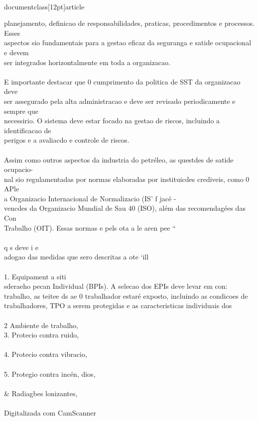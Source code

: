 \\documentclass[12pt]{article}
\begin{document}
{{{{{planejamento, definicao de responsabilidades, praticas, procedimentos e processos. Esses\\
aspectos sio fundamentais para a gestao eficaz da seguranga e satide ocupacional e devem\\
ser integrados horizontalmente em toda a organizacao.\\
\\
E importante destacar que 0 cumprimento da politica de SST da organizacao deve\\
ser assegurado pela alta administracao e deve ser revisado periodicamente e sempre que\\
necessirio. O sistema deve estar focado na gestao de riscos, incluindo a identificacao de\\
perigos e a avaliacdo e controle de riscos.\\
\\
Assim como outros aspectos da industria do petréleo, as questdes de satide ocupacio-\\
nal sio regulamentadas por normas elaboradas por instituicdes crediveis, como 0 APle\\
a Organizacio Internacional de Normalizacio (IS' f jacé -\\
vencdes da Organizacio Mundial de Sau 40 (ISO), além das recomendagées das Con\\
Trabalho (OIT). Essas normas e pels ota a le aren pee “\\
\\
q s deve i e\\
adogao das medidas que sero descritas a ote ‘ill\\
\\
1. Equipament a siti\\
sderaeho pecan Individual (BPIs). A selecao dos EPIs deve levar em con:\\
trabalho, as teitee ds ae 0 trabalhador estaré exposto, incluindo as condicoes de\\
trabalhadores, TPO a serem protegidas e as caracteristicas individuais dos\\
\\
2 Ambiente de trabalho,\\
3. Protecio contra ruido,\\
\\
4. Protecio contra vibracio,\\
\\
5. Protegio contra incén, dios,\\
\\& Radiagbes lonizantes,\\
\\
Digitalizada com CamScanner\\

}}}}}
\end{document}
